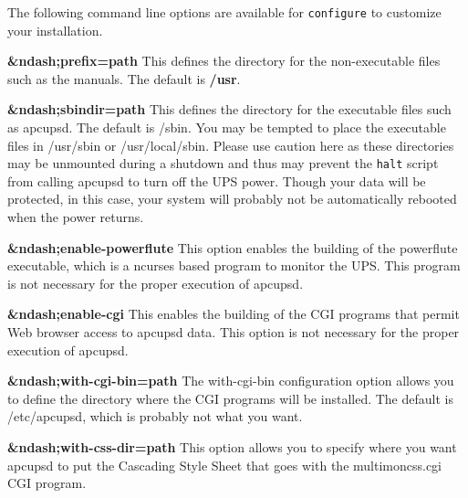 The following command line options are available for {\tt configure} to
customize your installation. 
\label{index-options_002c-_002d_002d_002dprefix-26}

\begin{description}

\item {\bf \&ndash;prefix=\lt{}path\gt{}}
This defines the directory for the non-executable files such as the manuals.
The default is {\bf /usr}.  

\label{index-options_002c-_002d_002d_002dsbindir-27}

\item {\bf \&ndash;sbindir=\lt{}path\gt{}}
This defines the directory for the executable files such as apcupsd. The
default is /sbin. You may be tempted to place the executable files in
/usr/sbin or /usr/local/sbin. Please use caution here as these directories may
be unmounted during a shutdown and thus may prevent the {\tt halt} script from
calling apcupsd to turn off the UPS power. Though your data will be protected,
in this case, your system will probably not be automatically rebooted when the
power returns.  

\label{index-options_002c-_002d_002d_002denable_002dpowerflute-28}

\item {\bf \&ndash;enable-powerflute}
This option enables the building of the powerflute executable, which is a
ncurses based program to monitor the UPS. This program is not necessary for
the proper execution of apcupsd.  

\label{index-options_002c-_002d_002d_002denable_002dcgi-29}

\item {\bf \&ndash;enable-cgi}
This enables the building of the CGI programs that permit Web browser access
to apcupsd data. This option is not necessary for the proper execution of
apcupsd.  

\item {\bf \&ndash;with-cgi-bin=\lt{}path\gt{}}
The with-cgi-bin configuration option allows you to define the directory where
the CGI programs will be installed. The default is /etc/apcupsd, which is
probably not what you want.  

\item {\bf \&ndash;with-css-dir=\lt{}path\gt{}}
This option allows you to specify where you want apcupsd to put the Cascading
Style Sheet that goes with the multimoncss.cgi CGI program.  


\end{description}
